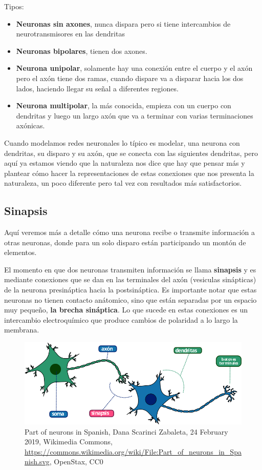 Tipos:

\begin{itemize}
\item \textbf{Neuronas sin axones}, nunca dispara pero si tiene intercambios de neurotransmisores en las dendritas   
\item \textbf{Neuronas bipolares}, tienen dos axones. 
\item \textbf{Neurona unipolar}, solamente hay una conexión entre el cuerpo y el axón pero el axón tiene dos ramas, cuando dispare va a disparar hacia los dos lados, haciendo llegar su señal a diferentes regiones. 
\item \textbf{Neurona multipolar}, la más conocida, empieza con un cuerpo con dendritas y luego un largo axón que va a terminar con varias terminaciones axónicas. 
\end{itemize}

Cuando modelamos redes neuronales lo típico es modelar, una neurona con dendritas, su disparo y su axón, que se conecta con las siguientes dendritas, pero aquí ya estamos viendo que la naturaleza nos dice que hay que pensar más y plantear cómo hacer la representaciones de estas conexiones que nos presenta la naturaleza, un poco diferente pero tal vez con resultados más satisfactorios.


\subsection{Sinapsis}
Aquí veremos más a detalle cómo una neurona recibe o transmite información a otras neuronas, donde para un solo disparo están participando un montón de elementos.

 El momento en que dos neuronas transmiten información se llama \textbf{sinapsis} y es mediante conexiones que se dan en las terminales del axón (vesiculas sinápticas) de la neurona presináptica hacia la postsináptica. Es importante notar que estas neuronas no tienen contacto anátomico, sino que están separadas por un espacio muy pequeño, \textbf{la brecha sináptica}. Lo que sucede en estas conexiones es un intercambio electroquímico que produce cambios de polaridad a lo largo la membrana. 


\begin{figure}[h]
 \centering
 \includegraphics[scale=0.5]{../Figuras/Part_of_neurons_in_Spanish.png}
 \caption{Part of neurons in Spanish, Dana Scarinci Zabaleta, 24 February 2019, Wikimedia Commons, \url{https://commons.wikimedia.org/wiki/File:Part_of_neurons_in_Spanish.svg}, OpenStax, CC0}
 \label{fig:sinapsisN}
\end{figure}

